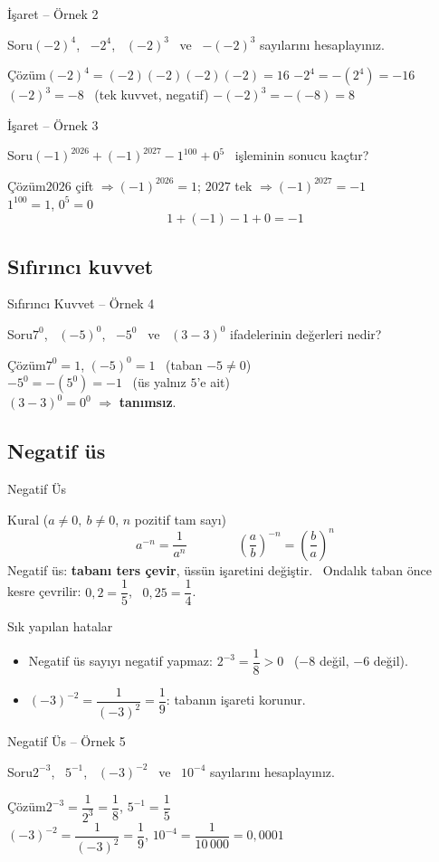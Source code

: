\documentclass[aspectratio=169,11pt,handout]{beamer}
\newcommand{\soru}[3]{%
\begin{frame}{#1}
  \begin{block}{Soru}\large #2\end{block}
  \pause
  \begin{exampleblock}{Çözüm}\large #3\end{exampleblock}
\end{frame}}
\begin{document}
\soru{İşaret -- Örnek 2}
{\((-2)^4\), \ \(-2^4\), \ \((-2)^3\) \ ve \ \(-(-2)^3\) sayılarını hesaplayınız.}
{\((-2)^4=(-2)(-2)(-2)(-2)=16\) \qquad \(-2^4=-(2^4)=-16\)\\[4pt]
\((-2)^3=-8\) \ (tek kuvvet, negatif) \qquad \(-(-2)^3=-(-8)=8\)}

\soru{İşaret -- Örnek 3}
{\((-1)^{2026}+(-1)^{2027}-1^{100}+0^{5}\) \ işleminin sonucu kaçtır?}
{\(2026\) çift \(\Rightarrow (-1)^{2026}=1\); \quad \(2027\) tek \(\Rightarrow (-1)^{2027}=-1\)\\[4pt]
\(1^{100}=1\), \quad \(0^5=0\)
\[1+(-1)-1+0=-1\]}

\subsection{Sıfırıncı kuvvet}
\soru{Sıfırıncı Kuvvet -- Örnek 4}
{\(7^0\), \ \((-5)^0\), \ \(-5^0\) \ ve \ \((3-3)^0\) ifadelerinin değerleri nedir?}
{\(7^0=1\), \qquad \((-5)^0=1\) \ (taban \(-5\neq 0\))\\[4pt]
\(-5^0=-(5^0)=-1\) \ (üs yalnız \(5\)'e ait)\\[4pt]
\((3-3)^0=0^0\) \(\Rightarrow\) \textbf{tanımsız}.}

\subsection{Negatif üs}
\begin{frame}{Negatif Üs}
\begin{block}{Kural (\(a\neq 0,\ b\neq 0\), \(n\) pozitif tam sayı)}
\[a^{-n}=\frac{1}{a^n}\qquad\qquad \left(\frac{a}{b}\right)^{-n}=\left(\frac{b}{a}\right)^{n}\]
Negatif üs: \textbf{tabanı ters çevir}, üssün işaretini değiştir. \ Ondalık taban önce kesre çevrilir: \(0{,}2=\dfrac15\), \ \(0{,}25=\dfrac14\).
\end{block}
\begin{alertblock}{Sık yapılan hatalar}
\begin{itemize}
\item Negatif üs sayıyı negatif yapmaz: \(2^{-3}=\dfrac18>0\) \ (\(-8\) değil, \(-6\) değil).
\item \((-3)^{-2}=\dfrac{1}{(-3)^2}=\dfrac19\): tabanın işareti korunur.
\end{itemize}
\end{alertblock}
\end{frame}

\soru{Negatif Üs -- Örnek 5}
{\(2^{-3}\), \ \(5^{-1}\), \ \((-3)^{-2}\) \ ve \ \(10^{-4}\) sayılarını hesaplayınız.}
{\(2^{-3}=\dfrac{1}{2^3}=\dfrac18\), \qquad \(5^{-1}=\dfrac15\)\\[4pt]
\((-3)^{-2}=\dfrac{1}{(-3)^2}=\dfrac19\), \qquad \(10^{-4}=\dfrac{1}{10\,000}=0{,}0001\)}
\end{document}
